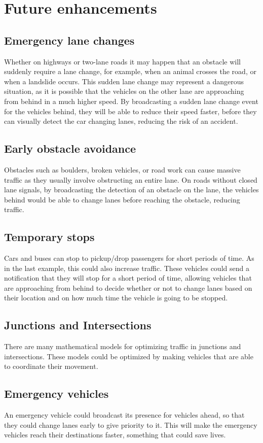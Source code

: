 \documentclass[11pt]{article}
\begin{document}
\clearpage
\section{Future enhancements}
\label{sec:orgb8e86d0}
\subsection{Emergency lane changes}
\label{sec:org5019f65}
Whether on highways or two-lane roads it may happen that an obstacle will
suddenly require a lane change, for example, when an animal crosses the road,
or when a landslide occurs. This sudden lane change may represent a dangerous
situation, as it is possible that the vehicles on the other lane are approaching from
behind in a much higher speed.
By broadcasting a sudden lane change event for the vehicles behind, they
will be able to reduce their speed faster, before they can visually detect the car
changing lanes, reducing the risk of an accident.
\subsection{Early obstacle avoidance}
\label{sec:org665a42f}
Obstacles such as boulders, broken vehicles, or road work can cause massive traffic
as they usually involve obstructing an entire lane. On roads without
closed lane signals, by broadcasting the detection of an obstacle on the lane, the
vehicles behind would be able to change lanes before reaching the obstacle, reducing traffic.
\subsection{Temporary stops}
\label{sec:org36105e6}
Cars and buses can stop to pickup/drop passengers for short periods of time.
As in the last example, this could also increase traffic. These vehicles could send
a notification that they will stop for a short period of time, allowing vehicles that are
approaching from behind to decide whether or not to change lanes based on their
location and on how much time the vehicle is going to be stopped.
\subsection{Junctions and Intersections}
\label{sec:orge4ad1b7}
There are many mathematical models for optimizing traffic in junctions and
intersections. These models could be optimized by making vehicles that are able
to coordinate their movement.
\subsection{Emergency vehicles}
\label{sec:orgcfd8698}
An emergency vehicle could broadcast its presence for vehicles ahead, so
that they could change lanes early to give priority to it. This will make
the emergency vehicles reach their destinations faster, something that could save lives.
\end{document}

